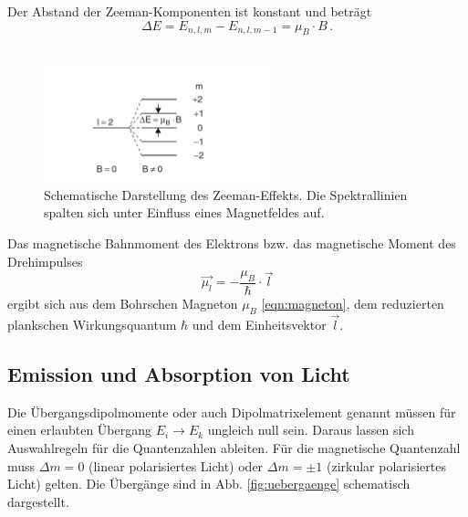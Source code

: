 Der Abstand der Zeeman-Komponenten ist konstant und beträgt
\begin{equation}
    \Delta E = E_{n,l,m} - E_{n,l,m-1} = \mu_B \cdot B \, .
    \label{eqn:energie_dif_normal}
\end{equation}
\\
\begin{figure}
    \centering
    \includegraphics[width=0.6\textwidth]{content/data/zeeman_aufspaltung.png}
    \caption{Schematische Darstellung des Zeeman-Effekts. Die Spektrallinien spalten sich unter Einfluss eines Magnetfeldes auf. \cite[150]{demtroeder}} %
    \label{fig:zeeman_aufspaltung}
\end{figure}

Das magnetische Bahnmoment des Elektrons bzw. das magnetische Moment des Drehimpulses
\begin{equation}
    \vec{\mu_l} = -\frac{\mu_B}{\hbar} \cdot \vec{l}
    \label{eqn:magn_moment_l}
\end{equation}
ergibt sich aus dem Bohrschen Magneton $\mu_B$ \eqref{eqn:magneton}, dem reduzierten plankschen Wirkungsquantum $\hbar$ und dem Einheitsvektor $\vec{l}$.
 
\subsection{Emission und Absorption von Licht}
Die Übergangsdipolmomente oder auch Dipolmatrixelement genannt müssen für einen erlaubten Übergang $E_i \rightarrow E_k$ ungleich null sein.
Daraus lassen sich Auswahlregeln für die Quantenzahlen ableiten.
Für die magnetische Quantenzahl muss $\Delta m = 0$ (linear polarisiertes Licht) oder $\Delta m = \pm 1$ (zirkular polarisiertes Licht) gelten.
Die Übergänge sind in Abb. \ref{fig:uebergaenge} schematisch dargestellt.

